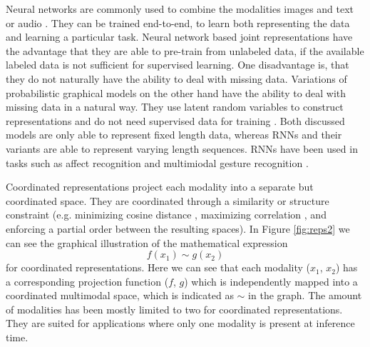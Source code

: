 \documentclass{article}
\begin{document}
Neural networks are commonly used to combine the modalities images and text \citep{silberer2014learning} or audio \citep{mroueh2015deep, ngiam2011multimodal, wu2014exploring}. They can be trained end-to-end, to learn both representing the data and learning a particular task. Neural network based joint representations have the advantage that they are able to pre-train from unlabeled data, if the available labeled data is not sufficient for supervised learning. One disadvantage is, that they do not naturally have the ability to deal with missing data. Variations of probabilistic graphical models on the other hand have the ability to deal with missing data in a natural way. They use latent random variables to construct representations \citep{bengio2013represent} and do not need supervised data for training \citep{salakhutdinov2009boltz}. Both discussed models are only able to represent fixed length data, whereas RNNs and their variants are able to represent varying length sequences. RNNs have been used in tasks such as affect recognition \citep{chen2015multi, nicolaou2011contin} and multimiodal gesture recognition \citep{rajagopalan2016extend}.

Coordinated representations project each modality into a separate but coordinated space. They are coordinated through a similarity or structure constraint (e.g. minimizing cosine distance \citep{frome2013devise}, maximizing correlation \citep{andrew2013deep}, and enforcing a partial order \citep{vendrov2016order} between the resulting spaces). In Figure \ref{fig:reps2} we can see the graphical illustration of the mathematical expression
\begin{equation}
f(x_1) \sim g(x_2)
\end{equation}
for coordinated representations. Here we can see that each modality ($x_1$, $x_2$) has a corresponding projection function ($f$, $g$) which is independently mapped into a coordinated multimodal space, which is indicated as $\sim$ in the graph. The amount of modalities has been mostly limited to two for coordinated representations. They are suited for applications where only one modality is present at inference time.
\end{document}
